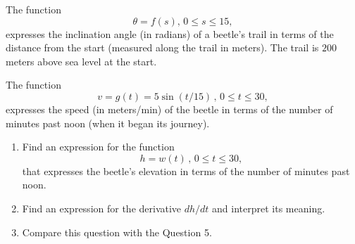 \documentclass{ximera}
\begin{document}
\begin{question} \label{QLdkf3555}
The function
\[
  \theta = f(s) , \, 0\le s\leq 15,
\]
expresses the inclination angle (in radians) of a beetle's trail in terms of the distance from the start (measured along the trail in meters). The trail is $200$ meters above sea level at the start.

The function 
\[
     v = g(t) = 5\sin (t/15) \, , \, 0\le t\leq 30,
\]
expresses the speed (in meters/min) of the beetle in terms of the number of minutes past noon (when it began its journey). 

\begin{enumerate}
    \item Find an expression for the function
    \[
         h = w(t) \, , \, 0\le t\leq 30,
    \]
    that expresses the beetle's elevation in terms of the number of minutes past noon.

    \item Find an expression for the derivative $dh/dt$ and interpret its meaning.

    \item Compare this question  with the Question 5.

\end{enumerate}
\end{question}
\end{document}
